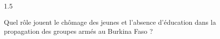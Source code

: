 \documentclass[12pt]{article}
\begin{document}
\begin{spacing}{1.5}

Quel rôle jouent le chômage des jeunes et l'absence d'éducation dans la propagation des groupes armés au Burkina Faso ?

\quad
\quad

\end{spacing}
\end{document}
